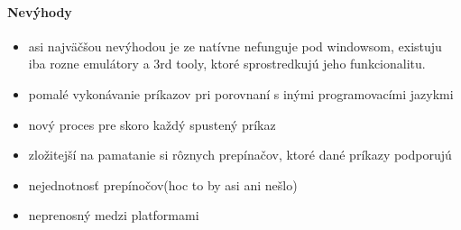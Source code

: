 \paragraph{Nevýhody}
\begin{itemize}
	\item asi najväčšou nevýhodou je ze natívne nefunguje pod windowsom, existuju iba rozne emulátory a 3rd tooly, ktoré sprostredkujú jeho funkcionalitu.
	\item pomalé vykonávanie príkazov pri porovnaní s inými programovacími jazykmi
	\item nový proces pre skoro každý spustený príkaz
	\item zložitejší na pamatanie si rôznych prepínačov, ktoré dané príkazy podporujú
	\item nejednotnosť prepínočov(hoc to by asi ani nešlo)
	\item neprenosný medzi platformami
\end{itemize}

